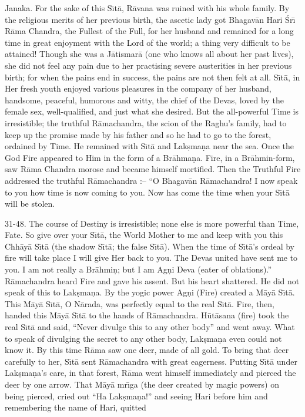 
Janaka. For the sake of this S\={\i}t\=a, R\=avana was ruined with his whole family. By the religious merits of her previous birth, the ascetic lady got Bhagav\=an Hari \'Sr\={\i} R\=ama Chandra, the Fullest of the Full, for her husband and remained for a long time in great enjoyment with the Lord of the world; a thing very difficult to be attained! Though she was a J\=atismar\=a (one who knows all about her past lives), she did not feel any pain due to her practising severe austerities in her previous birth; for when the pains end in success, the pains are not then felt at all. S\={\i}t\=a, in Her fresh youth enjoyed various pleasures in the company of her husband, handsome, peaceful, humorous and witty, the chief of the Devas, loved by the female sex, well-qualified, and just what she desired. But the all-powerful Time is irresistible; the truthful R\=amachandra, the scion of the Raghu's family, had to keep up the promise made by his father and so he had to go to the forest, ordained by Time. He remained with S\={\i}t\=a and Lak\d{s}ma\d{n}a near the sea. Once the God Fire appeared to Him in the form of a Br\=ahma\d{n}a. Fire, in a Br\=ahmin-form, saw R\=ama Chandra morose and became himself mortified. Then the Truthful Fire addressed the truthful R\=amachandra :-- ``O Bhagav\=an R\=amachandra! I now speak to you how time is now coming to you. Now has come the time when your S\={\i}t\=a will be stolen.

31-48. The course of Destiny is irresistible; none else is more powerful than Time, Fate. So give over your S\={\i}t\=a, the World Mother to me and keep with you this Chh\=ay\=a S\={\i}t\=a (the shadow S\={\i}t\=a; the false S\={\i}t\=a). When the time of S\={\i}t\=a's ordeal by fire will take place I will give Her back to you. The Devas united have sent me to you. I am not really a Br\=ahmi\d{n}; but I am Ag\d{n}i Deva (eater of oblations).'' R\=amachandra heard Fire and gave his assent. But his heart shattered. He did not speak of this to Lak\d{s}ma\d{n}a. By the yogic power Ag\d{n}i (Fire) created a M\=ay\=a S\={\i}t\=a. This M\=ay\=a S\={\i}t\=a, O N\=arada, was perfectly equal to the real S\={\i}t\=a. Fire, then, handed this M\=ay\=a S\={\i}t\=a to the hands of R\=amachandra. H\=ut\=asana (fire) took the real S\={\i}t\=a and said, ``Never divulge this to any other body'' and went away. What to speak of divulging the secret to any other body, Lak\d{s}ma\d{n}a even could not know it. By this time R\=ama saw one deer, made of all gold. To bring that deer carefully to her, S\={\i}t\=a sent R\=amachandra with great eagerness. Putting S\={\i}t\=a under Lak\d{s}ma\d{n}a's care, in that forest, R\=ama went himself immediately and pierced the deer by one arrow. That M\=ay\=a mr\={\i}ga (the deer created by magic powers) on being pierced, cried out ``Ha Lak\d{s}ma\d{n}a!'' and seeing Hari before him and remembering the name of Hari, quitted

